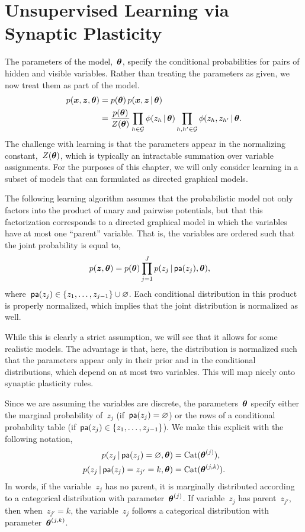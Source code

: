 \section{Unsupervised Learning via Synaptic Plasticity}
\label{sec:learning}
The parameters of the model,~$\boldsymbol{\theta}$, specify the conditional
probabilities for pairs of hidden and visible variables. Rather than
treating the parameters as given, we now treat them as part of the
model.
\begin{align}
  p(\boldsymbol{x}, \boldsymbol{z}, \boldsymbol{\theta}) &= p(\boldsymbol{\theta}) \, p(\boldsymbol{x}, \boldsymbol{z} \,|\, \boldsymbol{\theta})  \\
  &= \frac{p(\boldsymbol{\theta})}{Z(\boldsymbol{\theta})} \prod_{h \in \mathcal{G}} \phi(z_h \,|\, \boldsymbol{\theta}) \prod_{h,h' \in \mathcal{G}} \phi(z_h, z_{h'} \,|\, \boldsymbol{\theta}.
\end{align}
The challenge with learning is that the parameters appear in the
normalizing constant,~$Z(\boldsymbol{\theta})$, which is typically an intractable
summation over variable assignments. For the purposes of this chapter,
we will only consider learning in a subset of models that can
formulated as directed graphical models.

\begin{assumption}
  The following learning algorithm assumes that the probabilistic
  model not only factors into the product of unary and pairwise
  potentials, but that this factorization corresponds to a directed
  graphical model in which the variables have at most one ``parent''
  variable. That is, the variables are ordered such that the
  joint probability is equal to,
  \begin{align}
    p(\boldsymbol{z}, \boldsymbol{\theta}) &= p(\boldsymbol{\theta}) \prod_{j=1}^J p(z_j \,|\, \mathsf{pa}(z_j), \boldsymbol{\theta}),
  \end{align}
  where~$\mathsf{pa}(z_j) \in \{z_1, \ldots, z_{j-1}\} \cup \varnothing$.
  Each conditional distribution in this product is properly normalized,
  which implies that the joint distribution is normalized as well.
\end{assumption}

While this is clearly a strict assumption, we will see that it allows
for some realistic models. The advantage is that, here, the
distribution is normalized such that the parameters appear only
in their prior and in the conditional distributions, which depend
on at most two variables. This will map nicely onto synaptic plasticity
rules. 

Since we are assuming the variables
are discrete, the parameters~$\boldsymbol{\theta}$ specify either the marginal
probability of~$z_j$ (if~$\mathsf{pa}(z_j)=\varnothing$) or the rows of a
conditional probability table (if~$\mathsf{pa}(z_j) \in \{z_1, \ldots, z_{j-1}\}$).
We
make this explicit with the following notation,
\begin{align}
  p(z_j \,|\, \mathsf{pa}(z_j)=\varnothing, \boldsymbol{\theta}) &= \mathrm{Cat}(\boldsymbol{\theta}^{(j)}), \\
  p(z_j \,|\, \mathsf{pa}(z_{j})=z_{j'}=k, \boldsymbol{\theta}) &=  \mathrm{Cat}(\boldsymbol{\theta}^{(j,k)}).
\end{align}
In words, if the variable~$z_j$ has no parent, it is marginally distributed
according to a categorical distribution with parameter~$\boldsymbol{\theta}^{(j)}$.
If variable~$z_j$ has parent~$z_{j'}$, then when~$z_{j'}=k$, the
variable~$z_j$ follows a categorical distribution with
parameter~$\boldsymbol{\theta}^{(j,k)}$. 

